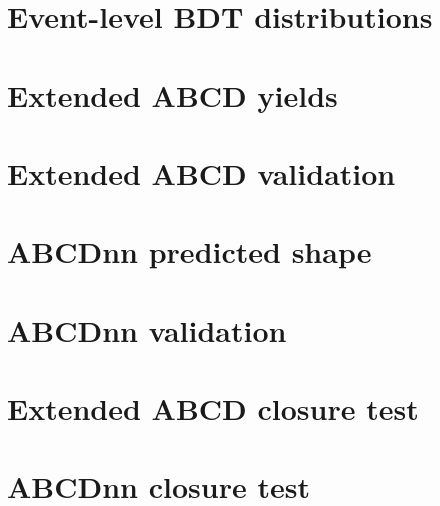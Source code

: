 \documentclass[twoside]{article}
\begin{document}
\section{Event-level BDT distributions}
\section{Extended ABCD yields}
\label{sec:extendedabcdapp}
\section{Extended ABCD validation}
\label{sec:extendedabcdvalapp}
\section{ABCDnn predicted shape}
\label{sec:abcdnnapp}
\section{ABCDnn validation}
\label{sec:abcdnnvalapp}
\section{Extended ABCD closure test}
\label{sec:extendedabcdclosuretestapp}
\section{ABCDnn closure test}
\label{sec:abcdnnclosuretestapp}



\end{document}
